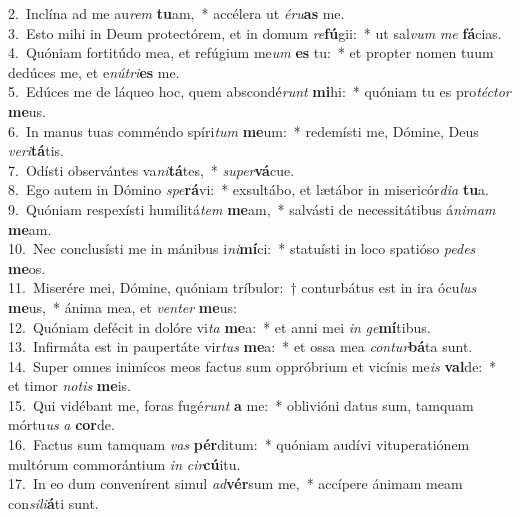 {2.~}Inclína ad me au\textit{rem} \textbf{tu}am,~* accélera ut \textit{é}\textit{ru}\textbf{as} me.\\
{3.~}Esto mihi in Deum protectórem, et in domum \textit{re}\textbf{fú}gii:~* ut sal\textit{vum} \textit{me} \textbf{fá}cias.\\
{4.~}Quóniam fortitúdo mea, et refúgium me\textit{um} \textbf{es} tu:~* et propter nomen tuum dedúces me, et e\textit{nú}\textit{tri}\textbf{es} me.\\
{5.~}Edúces me de láqueo hoc, quem abscondé\textit{runt} \textbf{mi}hi:~* quóniam tu es pro\textit{té}\textit{ctor} \textbf{me}us.\\
{6.~}In manus tuas comméndo spíri\textit{tum} \textbf{me}um:~* redemísti me, Dómine, Deus \textit{ve}\textit{ri}\textbf{tá}tis.\\
{7.~}Odísti observántes va\textit{ni}\textbf{tá}tes,~* \textit{su}\textit{per}\textbf{vá}cue.\\
{8.~}Ego autem in Dómino \textit{spe}\textbf{rá}vi:~* exsultábo, et lætábor in misericór\textit{di}\textit{a} \textbf{tu}a.\\
{9.~}Quóniam respexísti humilitá\textit{tem} \textbf{me}am,~* salvásti de necessitátibus á\textit{ni}\textit{mam} \textbf{me}am.\\
{10.~}Nec conclusísti me in mánibus i\textit{ni}\textbf{mí}ci:~* statuísti in loco spatióso \textit{pe}\textit{des} \textbf{me}os.\\
{11.~}Miserére mei, Dómine, quóniam tríbulor:~† conturbátus est in ira ócu\textit{lus} \textbf{me}us,~* ánima mea, et \textit{ven}\textit{ter} \textbf{me}us:\\
{12.~}Quóniam defécit in dolóre vi\textit{ta} \textbf{me}a:~* et anni mei \textit{in} \textit{ge}\textbf{mí}tibus.\\
{13.~}Infirmáta est in paupertáte vir\textit{tus} \textbf{me}a:~* et ossa mea \textit{con}\textit{tur}\textbf{bá}ta sunt.\\
{14.~}Super omnes inimícos meos factus sum oppróbrium et vicínis me\textit{is} \textbf{val}de:~* et timor \textit{no}\textit{tis} \textbf{me}is.\\
{15.~}Qui vidébant me, foras fugé\textit{runt} \textbf{a} me:~* oblivióni datus sum, tamquam mórtu\textit{us} \textit{a} \textbf{cor}de.\\
{16.~}Factus sum tamquam \textit{vas} \textbf{pér}ditum:~* quóniam audívi vituperatiónem multórum commorántium \textit{in} \textit{cir}\textbf{cú}itu.\\
{17.~}In eo dum convenírent simul \textit{ad}\textbf{vér}sum me,~* accípere ánimam meam con\textit{si}\textit{li}\textbf{á}ti sunt.\\
